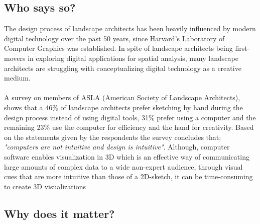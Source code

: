  	\subsection{Who says so?}
 	The design process of landscape architects has been heavily influenced by modern digital technology over the past 50 years, since Harvard's Laboratory of Computer Graphics was established.\cite{landscapeArchitectureDigiTech} In spite of landscape architects being first-movers in exploring digital applications for spatial analysis, many landscape architects are struggling with conceptualizing digital technology as a creative medium\cite{landscapeArchitectureDigiTech}. \\
 	\\
 	A survey on members of ASLA (American Society of Landscape Architects)\cite{surveySketchVSDigital}, shows that a 46\% of landscape architects prefer sketching by hand during the design process instead of using digital tools, 31\% prefer using a computer and the remaining 23\% use the computer for efficiency and the hand for creativity. Based on the statements given by the respondents the survey concludes that; \textit{"computers are not intuitive and design is intuitive"}\cite{landscapeArchitectureDigiTech}\cite{surveySketchVSDigital}. Although, computer software enables visualization in 3D which is an effective way of communicating large amounts of complex data to a wide non-expert audience, through visual cues that are more intuitive than those of a 2D-sketch, it can be time-consuming to create 3D visualizations\cite{landscapeVisual}
 	
 	\subsection{Why does it matter?}
 	
